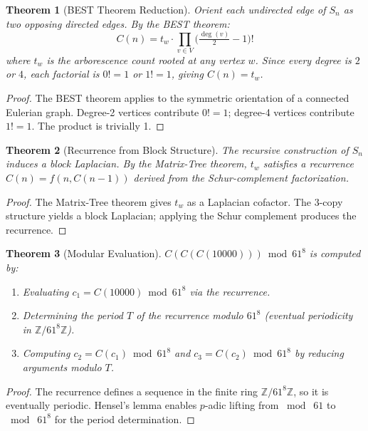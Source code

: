 \documentclass[12pt]{article}
\newtheorem{theorem}{Theorem}
\begin{document}
\begin{theorem}[BEST Theorem Reduction]\label{thm:best}
Orient each undirected edge of $S_n$ as two opposing directed edges. By the BEST theorem:
\[
    C(n) = t_w \cdot \prod_{v \in V}\bigl(\tfrac{\deg(v)}{2}-1\bigr)!
\]
where $t_w$ is the arborescence count rooted at any vertex $w$. Since every degree is $2$ or $4$, each factorial is $0!=1$ or $1!=1$, giving $C(n) = t_w$.
\end{theorem}

\begin{proof}
The BEST theorem applies to the symmetric orientation of a connected Eulerian graph. Degree-2 vertices contribute $0!=1$; degree-4 vertices contribute $1!=1$. The product is trivially 1.
\end{proof}

\begin{theorem}[Recurrence from Block Structure]\label{thm:recurrence}
The recursive construction of $S_n$ induces a block Laplacian. By the Matrix-Tree theorem, $t_w$ satisfies a recurrence $C(n) = f(n, C(n-1))$ derived from the Schur-complement factorization.
\end{theorem}

\begin{proof}
The Matrix-Tree theorem gives $t_w$ as a Laplacian cofactor. The $3$-copy structure yields a block Laplacian; applying the Schur complement produces the recurrence.
\end{proof}

\begin{theorem}[Modular Evaluation]
$C(C(C(10000))) \bmod 61^8$ is computed by:
\begin{enumerate}
    \item Evaluating $c_1 = C(10000) \bmod 61^8$ via the recurrence.
    \item Determining the period $T$ of the recurrence modulo $61^8$ (eventual periodicity in $\mathbb{Z}/61^8\mathbb{Z}$).
    \item Computing $c_2 = C(c_1) \bmod 61^8$ and $c_3 = C(c_2) \bmod 61^8$ by reducing arguments modulo $T$.
\end{enumerate}
\end{theorem}

\begin{proof}
The recurrence defines a sequence in the finite ring $\mathbb{Z}/61^8\mathbb{Z}$, so it is eventually periodic. Hensel's lemma enables $p$-adic lifting from $\bmod\;61$ to $\bmod\;61^8$ for the period determination.
\end{proof}
\end{document}
